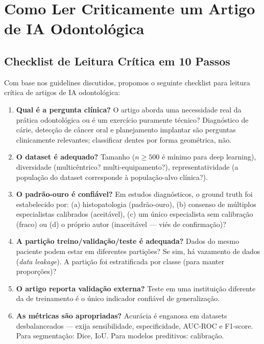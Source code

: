 \section{Como Ler Criticamente um Artigo de IA Odontológica}

\subsection{Checklist de Leitura Crítica em 10 Passos}

Com base nos guidelines discutidos, propomos o seguinte checklist para leitura crítica de artigos de IA odontológica:

\begin{enumerate}
    \item \textbf{Qual é a pergunta clínica?} O artigo aborda uma necessidade real da prática odontológica ou é um exercício puramente técnico? Diagnóstico de cárie, detecção de câncer oral e planejamento implantar são perguntas clinicamente relevantes; classificar dentes por forma geométrica, não.
    
    \item \textbf{O dataset é adequado?} Tamanho ($n \geq 500$ é mínimo para deep learning), diversidade (multicêntrico? multi-equipamento?), representatividade (a população do dataset corresponde à população-alvo clínica?).
    
    \item \textbf{O padrão-ouro é confiável?} Em estudos diagnósticos, o ground truth foi estabelecido por: (a) histopatologia (padrão-ouro), (b) consenso de múltiplos especialistas calibrados (aceitável), (c) um único especialista sem calibração (fraco) ou (d) o próprio autor (inaceitável — viés de confirmação)?
    
    \item \textbf{A partição treino/validação/teste é adequada?} Dados do mesmo paciente podem estar em diferentes partições? Se sim, há vazamento de dados (\textit{data leakage}). A partição foi estratificada por classe (para manter proporções)?
    
    \item \textbf{O artigo reporta validação externa?} Teste em uma instituição diferente da de treinamento é o único indicador confiável de generalização.
    
    \item \textbf{As métricas são apropriadas?} Acurácia é enganosa em datasets desbalanceados — exija sensibilidade, especificidade, AUC-ROC e F1-score. Para segmentação: Dice, IoU. Para modelos preditivos: calibração.
    

\end{enumerate}
